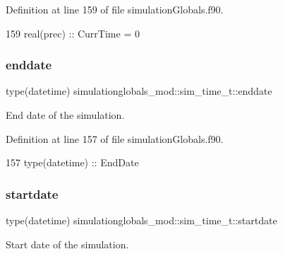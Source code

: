 Definition at line 159 of file simulation\+Globals.\+f90.


\begin{DoxyCode}
159         \textcolor{keywordtype}{real(prec)}      :: CurrTime = 0
\end{DoxyCode}
\mbox{\label{structsimulationglobals__mod_1_1sim__time__t_aaaf97413c1d145b1eb979ad2abbdd90e}} 
\subsubsection{\texorpdfstring{enddate}{enddate}}
{\footnotesize\ttfamily type(datetime) simulationglobals\+\_\+mod\+::sim\+\_\+time\+\_\+t\+::enddate\hspace{0.3cm}{\ttfamily [private]}}



End date of the simulation. 



Definition at line 157 of file simulation\+Globals.\+f90.


\begin{DoxyCode}
157         \textcolor{keywordtype}{type}(datetime)  :: EndDate
\end{DoxyCode}
\mbox{\label{structsimulationglobals__mod_1_1sim__time__t_a4d412156c617a836839456e857e249de}} 
\subsubsection{\texorpdfstring{startdate}{startdate}}
{\footnotesize\ttfamily type(datetime) simulationglobals\+\_\+mod\+::sim\+\_\+time\+\_\+t\+::startdate\hspace{0.3cm}{\ttfamily [private]}}



Start date of the simulation. 



